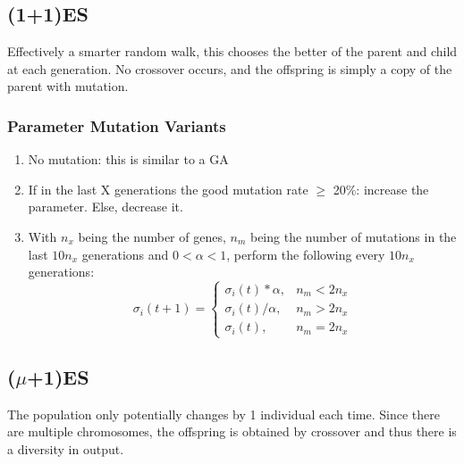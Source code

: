 \subsection{(1+1)ES}
Effectively a smarter random walk, this chooses the better of the parent and child at each generation. No crossover occurs, and the offspring is simply a copy of the parent with mutation.

\subsubsection{Parameter Mutation Variants}
\begin{enumerate}
    \item No mutation: this is similar to a GA
    \item If in the last X generations the good mutation rate $\geq$ 20\%: increase the parameter. Else, decrease it.
    \item With $n_x$ being the number of genes, $n_m $ being the number of mutations in the last $10n_x$ generations and $0<\alpha<1$,  perform the following every $10n_x$ generations:
    \[
    \sigma_i(t+1) = 
    \begin{cases}
        \sigma_i(t) * \alpha, &  n_m < 2n_x\\
        \sigma_i(t) / \alpha, &  n_m > 2n_x\\
        \sigma_i(t),  &  n_m = 2n_x
    \end{cases}
    \]
\end{enumerate}

\subsection{($\mu$+1)ES}
The population only potentially changes by 1 individual each time. Since there are multiple chromosomes, the offspring is obtained by crossover and thus there is a diversity in output. 